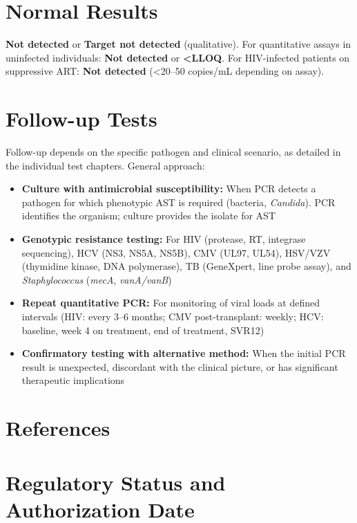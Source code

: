 \section*{Normal Results}
\textbf{Not detected} or \textbf{Target not detected} (qualitative). For quantitative assays in uninfected individuals: \textbf{Not detected} or \textbf{<LLOQ}. For HIV-infected patients on suppressive ART: \textbf{Not detected} (<20--50 copies/mL depending on assay).

\section*{Follow-up Tests}
Follow-up depends on the specific pathogen and clinical scenario, as detailed in the individual test chapters. General approach:
\begin{itemize}
  \item \textbf{Culture with antimicrobial susceptibility:} When PCR detects a pathogen for which phenotypic AST is required (bacteria, \textit{Candida}). PCR identifies the organism; culture provides the isolate for AST
  \item \textbf{Genotypic resistance testing:} For HIV (protease, RT, integrase sequencing), HCV (NS3, NS5A, NS5B), CMV (UL97, UL54), HSV/VZV (thymidine kinase, DNA polymerase), TB (GeneXpert, line probe assay), and \textit{Staphylococcus} (\textit{mecA}, \textit{vanA/vanB})
  \item \textbf{Repeat quantitative PCR:} For monitoring of viral loads at defined intervals (HIV: every 3--6 months; CMV post-transplant: weekly; HCV: baseline, week 4 on treatment, end of treatment, SVR12)
  \item \textbf{Confirmatory testing with alternative method:} When the initial PCR result is unexpected, discordant with the clinical picture, or has significant therapeutic implications
\end{itemize}

\section*{References}



\clearpage
\section*{Regulatory Status and Authorization Date}

\clearpage
